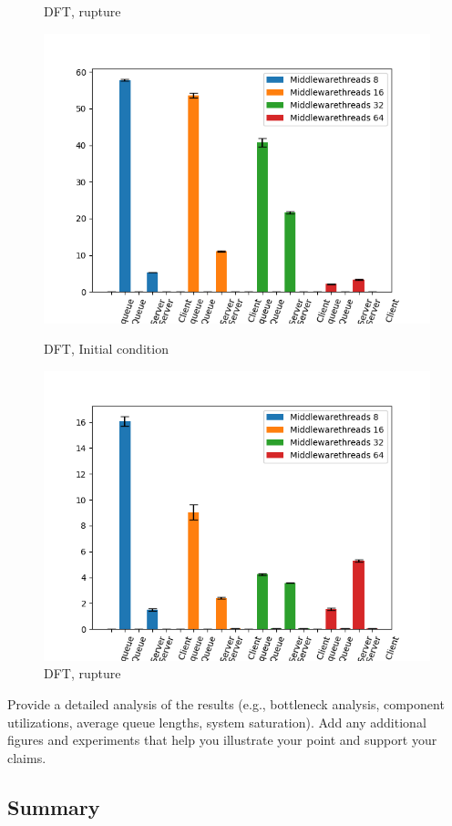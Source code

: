 \documentclass[11pt,a4paper]{article}
\begin{document}
\begin{figure}[H]
\begin{minipage}[b]{0.5\linewidth}
    \caption{DFT, rupture} 
    \vspace{4ex}
  \end{minipage} 
    \begin{minipage}[b]{0.5\linewidth}
    \centering
    \includegraphics[width=0.7\linewidth]{img/exp3_2/exp3_2_mw_percentile_plots_writes_0__vc_32.png} 
    \caption{DFT, Initial condition} 
    \vspace{4ex}
  \end{minipage}%
  \begin{minipage}[b]{0.5\linewidth}
    \centering
    \includegraphics[width=0.7\linewidth]{img/exp3_2/exp3_2_mw_percentile_plots_writes_1__vc_32.png} 
    \caption{DFT, rupture} 
    \vspace{4ex}
  \end{minipage} 
\end{figure}

Provide a detailed analysis of the results (e.g., bottleneck analysis, component utilizations, average queue lengths, system saturation). Add any additional figures and experiments that help you illustrate your point and support your claims.

\subsection{Summary}
\end{document}
